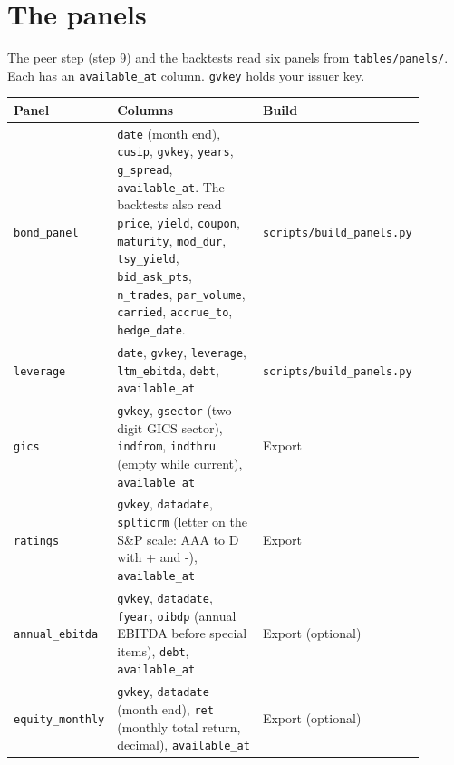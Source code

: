 \documentclass[10.5pt,a4paper]{article}
\newcommand{\code}[1]{\texttt{\small #1}}
\begin{document}
\section{The panels}

The peer step (step 9) and the backtests read six panels from \code{tables/\allowbreak{}panels/\allowbreak{}}. Each has an \code{available\_\allowbreak{}at} column. \code{gvkey} holds your issuer key.

\begin{longtable}{@{}>{\raggedright\arraybackslash}p{0.144\linewidth}>{\raggedright\arraybackslash}p{0.540\linewidth}>{\raggedright\arraybackslash}p{0.216\linewidth}@{}}
\toprule
\textbf{Panel} & \textbf{Columns} & \textbf{Build}\\
\midrule
\endhead
\code{bond\_\allowbreak{}panel} & \code{date} (month end), \code{cusip}, \code{gvkey}, \code{years}, \code{g\_\allowbreak{}spread}, \code{available\_\allowbreak{}at}. The backtests also read \code{price}, \code{yield}, \code{coupon}, \code{maturity}, \code{mod\_\allowbreak{}dur}, \code{tsy\_\allowbreak{}yield}, \code{bid\_\allowbreak{}ask\_\allowbreak{}pts}, \code{n\_\allowbreak{}trades}, \code{par\_\allowbreak{}volume}, \code{carried}, \code{accrue\_\allowbreak{}to}, \code{hedge\_\allowbreak{}date}. & \code{scripts/\allowbreak{}build\_\allowbreak{}panels.py}\\
\code{leverage} & \code{date}, \code{gvkey}, \code{leverage}, \code{ltm\_\allowbreak{}ebitda}, \code{debt}, \code{available\_\allowbreak{}at} & \code{scripts/\allowbreak{}build\_\allowbreak{}panels.py}\\
\code{gics} & \code{gvkey}, \code{gsector} (two-digit GICS sector), \code{indfrom}, \code{indthru} (empty while current), \code{available\_\allowbreak{}at} & Export\\
\code{ratings} & \code{gvkey}, \code{datadate}, \code{splticrm} (letter on the S\&P scale: AAA to D with + and -), \code{available\_\allowbreak{}at} & Export\\
\code{annual\_\allowbreak{}ebitda} & \code{gvkey}, \code{datadate}, \code{fyear}, \code{oibdp} (annual EBITDA before special items), \code{debt}, \code{available\_\allowbreak{}at} & Export (optional)\\
\code{equity\_\allowbreak{}monthly} & \code{gvkey}, \code{datadate} (month end), \code{ret} (monthly total return, decimal), \code{available\_\allowbreak{}at} & Export (optional)\\
\bottomrule
\end{longtable}
\end{document}
